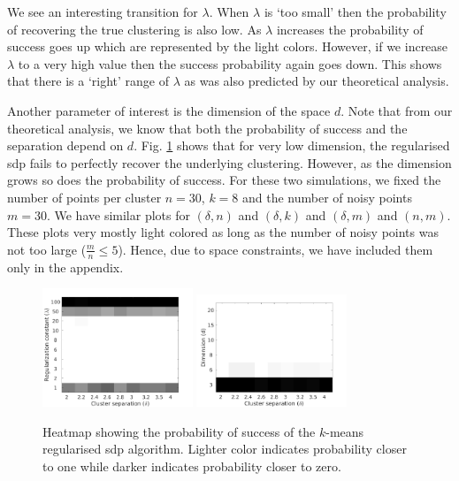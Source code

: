 \documentclass[12pt]{article}
\begin{document}
We see an interesting transition for $\lambda$. When $\lambda$ is `too small' then the probability of recovering the true clustering is also low. As $\lambda$ increases the probability of success goes up which are represented by the light colors. However, if we increase $\lambda$ to a very high value then the success probability again goes down. This shows that there is a `right' range of $\lambda$ as was also predicted by our theoretical analysis. 

Another parameter of interest is the dimension of the space $d$. Note that from our theoretical analysis, we know that both the probability of success and the separation depend on $d$. Fig. \ref{figure:simulation} shows that for very low dimension, the regularised sdp fails to perfectly recover the underlying clustering. However, as the dimension grows so does the probability of success. For these two simulations, we fixed the number of points per cluster $n = 30$, $k = 8$ and the number of noisy points $m = 30$. We have similar plots for $(\delta, n)$ and $(\delta, k)$ and $(\delta, m)$ and $(n, m)$. These plots very mostly light colored as long as the number of noisy points was not too large ($\frac{m}{n} \le 5$). Hence, due to space constraints, we have included them only in the appendix.
   
\begin{figure}[t]
  \centering
  \includegraphics[width=0.4\textwidth]{figures/optimizationClustering/deltaLambda.png}
  \includegraphics[width=0.4\textwidth]{figures/optimizationClustering/deltaD.png}
  \caption{Heatmap showing the probability of success of the $k$-means regularised sdp algorithm. Lighter color indicates probability closer to one while darker indicates probability closer to zero.}  
  \label{figure:simulation}
\end{figure}
\end{document}
